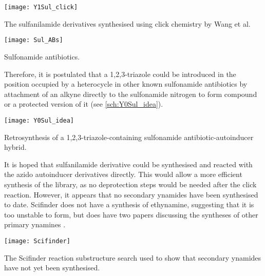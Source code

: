 \begin{scheme}[H]
	\begin{center}
		\texttt{[image: Y1Sul\_click]}
		\caption{The sulfanilamide derivatives synthesised using click chemistry by Wang et al\cite{Wang2010}.
		\label{sch:Y1Sul_click}}
	\end{center}
\end{scheme}

\begin{scheme}[H]
	\begin{center}
		\texttt{[image: Sul\_ABs]}
		\caption{Sulfonamide antibiotics.
		\label{fig:Sul_ABs}}
	\end{center}
\end{scheme}

Therefore, it is postulated that a 1,2,3-triazole could be introduced in the position occupied by a heterocycle in other known sulfonamide antibiotics by attachment of an alkyne directly to the sulfonamide nitrogen to form compound  or a protected version of it (see \ref{sch:Y0Sul_idea}).

\begin{scheme}[H]
	\begin{center}
		\texttt{[image: Y0Sul\_idea]}
		\caption{Retrosynthesis of a 1,2,3-triazole-containing sulfonamide antibiotic-autoinducer hybrid.
		\label{sch:Y0Sul_idea}}
	\end{center}
\end{scheme}



It is hoped that sulfanilamide derivative  could be synthesised and reacted with the azido autoinducer derivatives directly. This would allow a more efficient synthesis of the library, as no deprotection steps would be needed after the click reaction. However, it appears that no secondary ynamides have been synthesised to date\cite{ScifinderSecondaryYnamide}.
Scifinder does not have a synthesis of ethynamine, suggesting that it is too unstable to form, but does have two papers discussing the syntheses of other primary ynamines \cite{Shvartsberg1976,Hill1998}.

\begin{scheme}[H]
	\begin{center}
		\texttt{[image: Scifinder]}
		\caption{The Scifinder reaction substructure search used to show that secondary ynamides have not yet been synthesised\cite{ScifinderSecondaryYnamide}.
		\label{fig:Scifinder}}
	\end{center}
\end{scheme}

